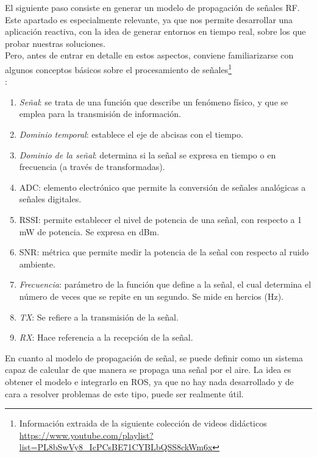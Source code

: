 El siguiente paso consiste en generar un modelo de propagación de señales \ac{RF}. Este apartado es especialmente relevante, ya que nos permite desarrollar una aplicación reactiva, con la idea de generar entornos en tiempo real, sobre los que probar nuestras soluciones.\\

Pero, antes de entrar en detalle en estos aspectos, conviene familiarizarse con algunos conceptos básicos sobre el procesamiento de señales\footnote[1]{Información extraida de la siguiente colección de videos didácticos \url{https://www.youtube.com/playlist?list=PL8bSwVy8_IcPCsBE71CYBLbQSS8ckWm6x}}\\:

\begin{enumerate}
	\item \emph{Señal}: se trata de una función que describe un fenómeno físico, y que se emplea para la transmisión de información.

    \item \emph{Dominio temporal}: establece el eje de abcisas con el tiempo.

    \item \emph{Dominio de la señal}: determina si la señal se expresa en tiempo o en frecuencia (a través de transformadas).

    \item \ac{ADC}: elemento electrónico que permite la conversión de señales analógicas a señales digitales.

    \item \ac{RSSI}: permite establecer el nivel de potencia de una señal, con respecto a 1 mW de potencia. Se expresa en dBm.

    \item \ac{SNR}: métrica que permite medir la potencia de la señal con respecto al ruido ambiente.

    \item \emph{Frecuencia}: parámetro de la función que define a la señal, el cual determina el número de veces que se repite en un segundo. Se mide en hercios (Hz).

    \item \emph{TX}: Se refiere a la transmisión de la señal.

    \item \emph{RX}: Hace referencia a la recepción de la señal.
\end{enumerate}

En cuanto al modelo de propagación de señal, se puede definir como un sistema capaz de calcular de que manera se propaga una señal por el aire. La idea es obtener el modelo e integrarlo en \ac{ROS}, ya que no hay nada desarrollado y de cara a resolver problemas de este tipo, puede ser realmente útil.\\

